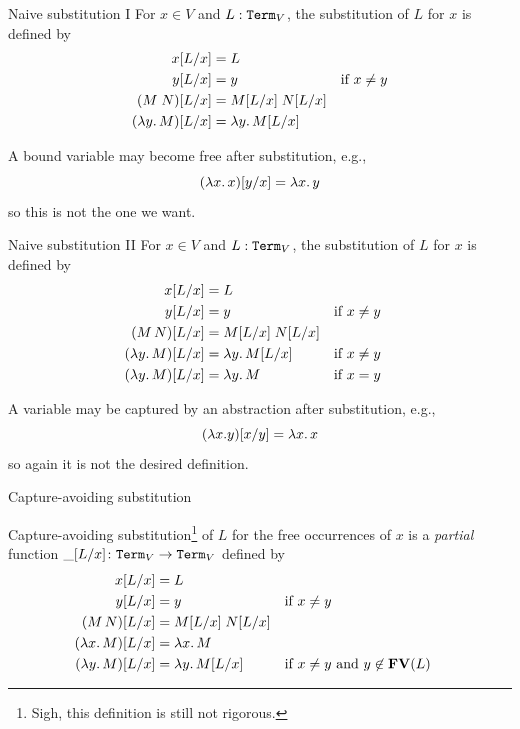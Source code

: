 \begin{frame}{Naive substitution I}
    For $x \in V$ and $L : \mathtt{Term}_V$, the substitution of $L$ for $x$ is
    defined by
    \begin{align*}
      x[{L}/{x}] & = L \\
      y[{L}/{x}] & = y & \text{if $x \neq y$} \\
      (M\;N)[{L}/{x}]& = M[{L}/{x}] \; N[{L}/{x}] \\
      (\lambda y.\, M)[{L}/{x}] & = \lambda y.\, M [{L}/{x}]
    \end{align*}

    A bound variable may become free after substitution, e.g.,\  
    \[
      (\lambda x.\, x)[{y}/{x}] = \lambda x.\, y
    \]
    so this is not the one we want.
\end{frame}
\begin{frame}{Naive substitution II}
    For $x \in V$ and $L : \mathtt{Term}_V$, the substitution
    of $L$ for $x$ is defined by
    \begin{align*}
      x[{L}/{x}] & = L \\
      y[{L}/{x}] & = y && \text{if $x \neq y$} \\
      (M\,N)[{L}/{x}] & = M[{L}/{x}]\; N[{L}/{x}] \\
      (\lambda y.\, M)[{L}/{x}] & = \lambda y.\, M[{L}/{x}] && \text{if $x \neq y$} \\
      (\lambda y.\, M)[{L}/{x}] & = \lambda y.\, M && \text{if $x = y$} 
    \end{align*}

    A variable may be captured by an abstraction after substitution, e.g.,
    \[
      (\lambda x. y)[{x}/{y}] = \lambda x.\, x
    \]
    so again it is not the desired definition.
\end{frame}


\begin{frame}{Capture-avoiding substitution}
  \begin{definition}
    Capture-avoiding substitution\footnote{Sigh, this definition is still not rigorous.} of $L$ for the \alert{free occurrences} of $x$ is a
    \emph{partial} function $\_[{L}/{x}]\colon \mathtt{Term}_V \to \mathtt{Term}_V$ defined by
    \begin{align*}
      x[{L}/{x}] & = L \\
      y[{L}/{x}] & = y && \text{if $x \neq y$} \\
      (M\, N)[{L}/{x}] & = M[{L}/{x}]\; N[{L}/{x}] \\
      (\lambda x.\, M)[{L}/{x}] & = \lambda x.\, M \\
      (\lambda y.\, M)[{L}/{x}] & = \lambda y.\, M[{L}/{x}]                                 &&\text{if $x \neq y$ and $y \not\in \mathbf{FV}(L)$}
    \end{align*}
  \end{definition}

\end{frame}

